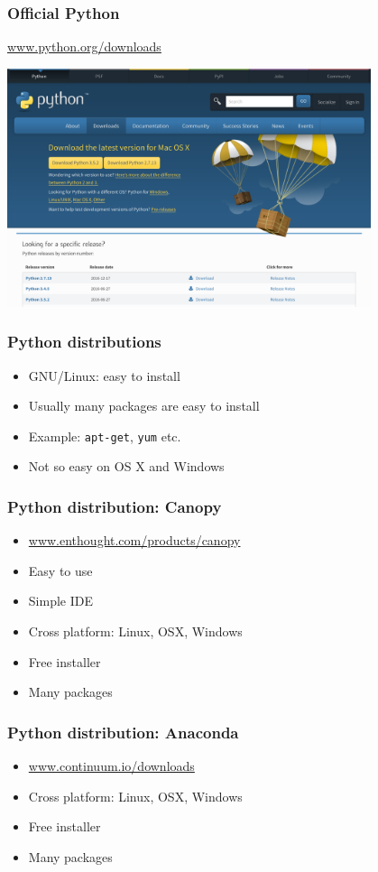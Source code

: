 \documentclass[14pt,compress]{beamer}
\newcommand{\typ}[1]{\lstinline{#1}}
\begin{document}
\begin{frame}[plain]
  \frametitle{Official Python}
  \begin{center}
    \url{www.python.org/downloads}

    \includegraphics[height=2.75in]{data/intro/python_download}
  \end{center}
\end{frame}

\begin{frame}
  \frametitle{Python distributions}
  \begin{itemize}
  \item GNU/Linux: easy to install
  \item Usually many packages are easy to install
  \item Example: \typ{apt-get}, \typ{yum} etc.
  \item Not so easy on OS X and Windows
  \end{itemize}
\end{frame}

\begin{frame}
  \frametitle{Python distribution: Canopy}
  \begin{itemize}
  \item \url{www.enthought.com/products/canopy}
  \item Easy to use
  \item Simple IDE
  \item Cross platform: Linux, OSX, Windows
  \item Free installer
  \item Many packages
  \end{itemize}
\end{frame}

\begin{frame}
  \frametitle{Python distribution: Anaconda}
  \begin{itemize}
  \item \url{www.continuum.io/downloads}
  \item Cross platform: Linux, OSX, Windows
  \item Free installer
  \item Many packages
  \end{itemize}
\end{frame}
\end{document}
